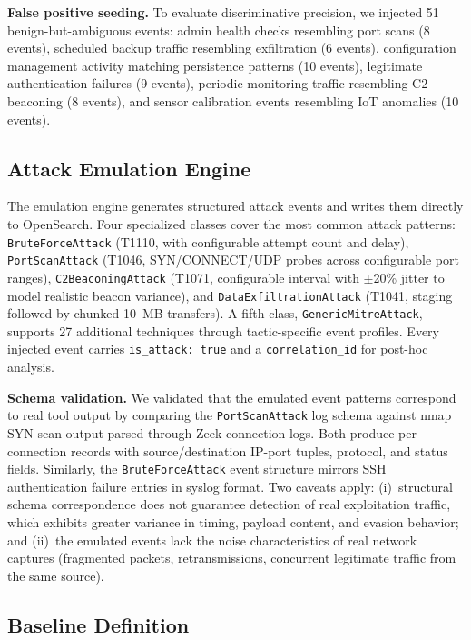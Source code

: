 \documentclass[conference,10pt]{IEEEtran}
\begin{document}
\textbf{False positive seeding.} To evaluate discriminative precision, we injected 51 benign-but-ambiguous events: admin health checks resembling port scans (8 events), scheduled backup traffic resembling exfiltration (6 events), configuration management activity matching persistence patterns (10 events), legitimate authentication failures (9 events), periodic monitoring traffic resembling C2 beaconing (8 events), and sensor calibration events resembling IoT anomalies (10 events).

\subsection{Attack Emulation Engine}

The emulation engine generates structured attack events and writes them directly to OpenSearch. Four specialized classes cover the most common attack patterns: \texttt{BruteForceAttack} (T1110, with configurable attempt count and delay), \texttt{PortScanAttack} (T1046, SYN/CONNECT/UDP probes across configurable port ranges), \texttt{C2BeaconingAttack} (T1071, configurable interval with $\pm$20\% jitter to model realistic beacon variance), and \texttt{DataExfiltrationAttack} (T1041, staging followed by chunked 10~MB transfers). A fifth class, \texttt{GenericMitreAttack}, supports 27 additional techniques through tactic-specific event profiles. Every injected event carries \texttt{is\_attack: true} and a \texttt{correlation\_id} for post-hoc analysis.

\textbf{Schema validation.} We validated that the emulated event patterns correspond to real tool output by comparing the \texttt{PortScanAttack} log schema against nmap SYN scan output parsed through Zeek connection logs. Both produce per-connection records with source/destination IP-port tuples, protocol, and status fields. Similarly, the \texttt{BruteForceAttack} event structure mirrors SSH authentication failure entries in syslog format. Two caveats apply: (i)~structural schema correspondence does not guarantee detection of real exploitation traffic, which exhibits greater variance in timing, payload content, and evasion behavior; and (ii)~the emulated events lack the noise characteristics of real network captures (fragmented packets, retransmissions, concurrent legitimate traffic from the same source).

\subsection{Baseline Definition}
\end{document}
